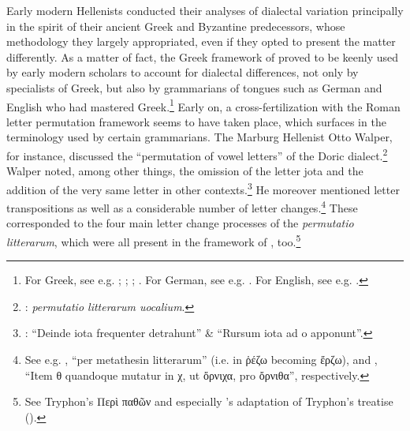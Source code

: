 Early modern Hellenists conducted their analyses of dialectal variation principally in the spirit of their ancient Greek and Byzantine predecessors, whose methodology they largely appropriated, even if they opted to present the matter differently. As a matter of fact, the Greek framework of  proved to be keenly used by early modern scholars to account for dialectal differences, not only by specialists of Greek, but also by grammarians of  tongues such as German and English who had mastered Greek.\footnote{{For Greek, see e.g. \citet[b.iv\textsc{\textsuperscript{v}}]{Melanchthon1518}; \citet[{7}{\textsc{\textsuperscript{v}}}{–11}{\textsc{\textsuperscript{v}}}]{Baile1588}; \citet[11]{Schmidt1604}; \citet[2–8, 20–22]{Hill1658}. For German, see e.g. \citet{Wolf1578}. For English, see e.g. \citet[130--133]{Gill1619}.}} Early on, a cross-fertilization with the Roman letter permutation framework seems to have taken place, which surfaces in the terminology used by certain grammarians. The Marburg Hellenist Otto Walper, for instance, discussed the “permutation of vowel letters” of the Doric dialect.\footnote{{\citet[62]{Walper1589}:} {\textit{permutatio litterarum uocalium}}.} Walper noted, among other things, the omission of the letter jota and the addition of the very same letter in other contexts.\footnote{{\citet[63]{Walper1589}: “Deinde iota frequenter detrahunt” \& “Rursum iota ad o apponunt”.}} He moreover mentioned letter transpositions as well as a considerable number of letter changes.\footnote{{See e.g. \citet[63]{Walper1589}, “per metathesin litterarum” (i.e. in ῥέζω becoming ἔρζω), and \citet[64]{Walper1589}, “Item θ quandoque mutatur in χ, ut ὄρνιχα, pro ὄρνιθα”, respectively.}} These corresponded to the four main letter change processes of the \textit{permutatio litterarum}, which were all present in the framework of , too.\footnote{{See Tryphon’s Περὶ παθῶν and especially \citeauthor{Amerot1520}'s adaptation of Tryphon’s  treatise  (\citeyear[\textsc{p.}{iv}{\textsc{\textsuperscript{v}}}]{Amerot1520}).}}

